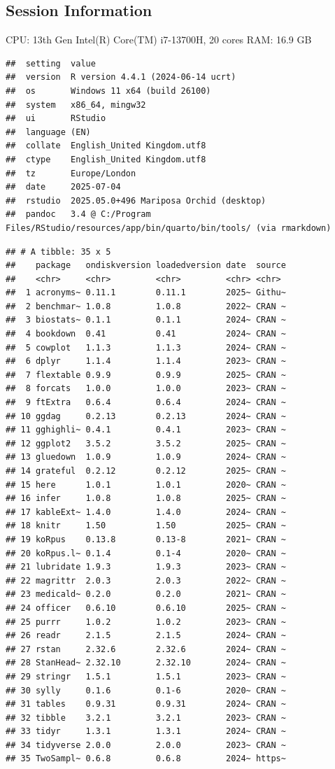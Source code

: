 \documentclass[
]{article}
\begin{document}
\subsection{Session Information}\label{Session-Information}

CPU: 13th Gen Intel(R) Core(TM) i7-13700H, 20 cores \newline
RAM: 16.9 GB

\begin{verbatim}
##  setting  value
##  version  R version 4.4.1 (2024-06-14 ucrt)
##  os       Windows 11 x64 (build 26100)
##  system   x86_64, mingw32
##  ui       RStudio
##  language (EN)
##  collate  English_United Kingdom.utf8
##  ctype    English_United Kingdom.utf8
##  tz       Europe/London
##  date     2025-07-04
##  rstudio  2025.05.0+496 Mariposa Orchid (desktop)
##  pandoc   3.4 @ C:/Program Files/RStudio/resources/app/bin/quarto/bin/tools/ (via rmarkdown)
\end{verbatim}

\begin{verbatim}
## # A tibble: 35 x 5
##    package   ondiskversion loadedversion date  source
##    <chr>     <chr>         <chr>         <chr> <chr> 
##  1 acronyms~ 0.11.1        0.11.1        2025~ Githu~
##  2 benchmar~ 1.0.8         1.0.8         2022~ CRAN ~
##  3 biostats~ 0.1.1         0.1.1         2024~ CRAN ~
##  4 bookdown  0.41          0.41          2024~ CRAN ~
##  5 cowplot   1.1.3         1.1.3         2024~ CRAN ~
##  6 dplyr     1.1.4         1.1.4         2023~ CRAN ~
##  7 flextable 0.9.9         0.9.9         2025~ CRAN ~
##  8 forcats   1.0.0         1.0.0         2023~ CRAN ~
##  9 ftExtra   0.6.4         0.6.4         2024~ CRAN ~
## 10 ggdag     0.2.13        0.2.13        2024~ CRAN ~
## 11 gghighli~ 0.4.1         0.4.1         2023~ CRAN ~
## 12 ggplot2   3.5.2         3.5.2         2025~ CRAN ~
## 13 gluedown  1.0.9         1.0.9         2024~ CRAN ~
## 14 grateful  0.2.12        0.2.12        2025~ CRAN ~
## 15 here      1.0.1         1.0.1         2020~ CRAN ~
## 16 infer     1.0.8         1.0.8         2025~ CRAN ~
## 17 kableExt~ 1.4.0         1.4.0         2024~ CRAN ~
## 18 knitr     1.50          1.50          2025~ CRAN ~
## 19 koRpus    0.13.8        0.13-8        2021~ CRAN ~
## 20 koRpus.l~ 0.1.4         0.1-4         2020~ CRAN ~
## 21 lubridate 1.9.3         1.9.3         2023~ CRAN ~
## 22 magrittr  2.0.3         2.0.3         2022~ CRAN ~
## 23 medicald~ 0.2.0         0.2.0         2021~ CRAN ~
## 24 officer   0.6.10        0.6.10        2025~ CRAN ~
## 25 purrr     1.0.2         1.0.2         2023~ CRAN ~
## 26 readr     2.1.5         2.1.5         2024~ CRAN ~
## 27 rstan     2.32.6        2.32.6        2024~ CRAN ~
## 28 StanHead~ 2.32.10       2.32.10       2024~ CRAN ~
## 29 stringr   1.5.1         1.5.1         2023~ CRAN ~
## 30 sylly     0.1.6         0.1-6         2020~ CRAN ~
## 31 tables    0.9.31        0.9.31        2024~ CRAN ~
## 32 tibble    3.2.1         3.2.1         2023~ CRAN ~
## 33 tidyr     1.3.1         1.3.1         2024~ CRAN ~
## 34 tidyverse 2.0.0         2.0.0         2023~ CRAN ~
## 35 TwoSampl~ 0.6.8         0.6.8         2024~ https~
\end{verbatim}

\newpage
\end{document}
